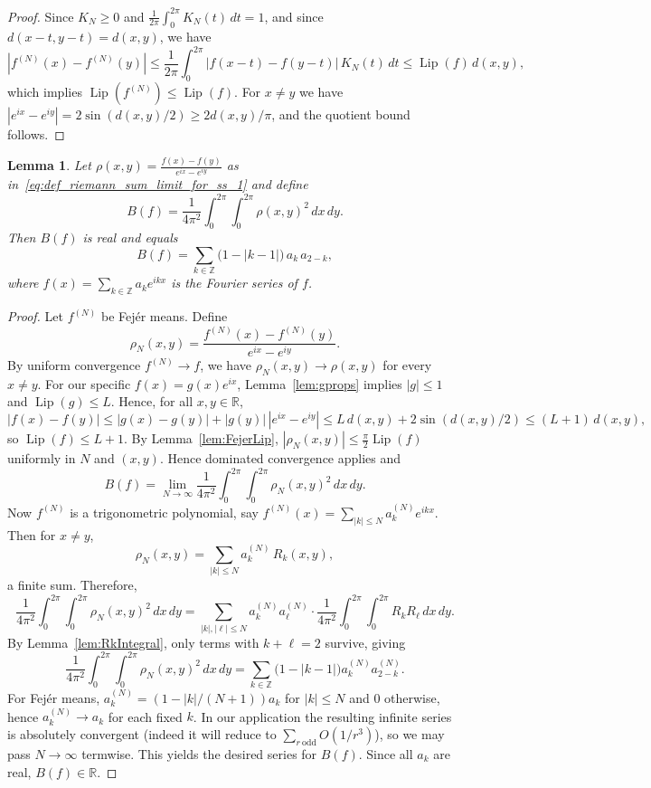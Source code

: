 \documentclass{article}
\newtheorem{lem}[thr]{Lemma}
\theoremstyle{definition}
\let\le\leqslant
\let\ge\geqslant
\DeclareMathOperator{\Lip}{Lip}
\begin{document}
\begin{proof}
Since $K_N\ge 0$ and $\frac{1}{2\pi}\int_0^{2\pi}K_N(t)\,dt=1$, and since $d(x-t,y-t)=d(x,y)$, we have
\[
|f^{(N)}(x)-f^{(N)}(y)|
\le \frac{1}{2\pi}\int_0^{2\pi}|f(x-t)-f(y-t)|\,K_N(t)\,dt
\le \Lip(f)\,d(x,y),
\]
which implies $\Lip(f^{(N)})\le \Lip(f)$.
For $x\neq y$ we have $|e^{ix}-e^{iy}|=2\sin(d(x,y)/2)\ge 2d(x,y)/\pi$, and the quotient bound follows.
\end{proof}





\begin{lem}\label{lem:JFourier}
Let $\rho(x,y)=\frac{f(x)-f(y)}{e^{ix}-e^{iy}}$ as in~\eqref{eq:def_riemann_sum_limit_for_ss_1} and define
\[
B(f)=\frac{1}{4\pi^2}\int_0^{2\pi}\int_0^{2\pi}\rho(x,y)^2\,dx\,dy.
\]
Then $B(f)$ is real and equals
\[
B(f)=\sum_{k\in\mathbb Z}\bigl(1-|k-1|\bigr)\,a_k\,a_{2-k},
\]
where $f(x)=\sum_{k\in\mathbb Z} a_k e^{ikx}$ is the Fourier series of $f$.
\end{lem}

\begin{proof}
Let $f^{(N)}$ be Fej\'er means. Define
\[
\rho_N(x,y)=\frac{f^{(N)}(x)-f^{(N)}(y)}{e^{ix}-e^{iy}}.
\]
By uniform convergence $f^{(N)}\to f$, we have $\rho_N(x,y)\to \rho(x,y)$ for every $x\neq y$. For our specific $f(x)=g(x)e^{ix}$, Lemma~\ref{lem:gprops} implies $|g|\le1$ and $\Lip(g)\le L$.
Hence, for all $x,y\in\mathbb R$,
\[
|f(x)-f(y)|
\le |g(x)-g(y)|+|g(y)|\,|e^{ix}-e^{iy}|
\le L\,d(x,y)+2\sin(d(x,y)/2)
\le (L+1)\,d(x,y),
\]
so $\Lip(f)\le L+1$. By Lemma~\ref{lem:FejerLip}, $|\rho_N(x,y)|\le \frac{\pi}{2}\Lip(f)$ uniformly in $N$ and $(x,y)$.
Hence dominated convergence applies and
\[
B(f)=\lim_{N\to\infty}\frac{1}{4\pi^2}\int_0^{2\pi}\int_0^{2\pi} \rho_N(x,y)^2\,dx\,dy.
\]
Now $f^{(N)}$ is a trigonometric polynomial, say
$f^{(N)}(x)=\sum_{|k|\le N} a_k^{(N)} e^{ikx}$.
Then for $x\neq y$,
\[
\rho_N(x,y)=\sum_{|k|\le N} a_k^{(N)}\,R_k(x,y),
\]
a finite sum. Therefore,
\[
\frac{1}{4\pi^2}\int_0^{2\pi}\int_0^{2\pi} \rho_N(x,y)^2\,dx\,dy
=\sum_{|k|,|\ell|\le N} a_k^{(N)}a_\ell^{(N)}
\cdot \frac{1}{4\pi^2}\int_0^{2\pi}\int_0^{2\pi} R_k R_\ell\,dx\,dy.
\]
By Lemma~\ref{lem:RkIntegral}, only terms with $k+\ell=2$ survive, giving
\[
\frac{1}{4\pi^2}\int_0^{2\pi}\int_0^{2\pi} \rho_N(x,y)^2\,dx\,dy
=\sum_{k\in\mathbb Z}\bigl(1-|k-1|\bigr)a_k^{(N)}a_{2-k}^{(N)}.
\]
For Fej\'er means, $a_k^{(N)}=(1-|k|/(N+1))a_k$ for $|k|\le N$ and $0$ otherwise, hence $a_k^{(N)}\to a_k$
for each fixed $k$.
In our application the resulting infinite series is absolutely convergent (indeed it will reduce to $\sum_{r\ \mathrm{odd}}O(1/r^3)$),
so we may pass $N\to\infty$ termwise.
This yields the desired series for $B(f)$.
Since all $a_k$ are real, $B(f)\in\mathbb R$.
\end{proof}
\end{document}
